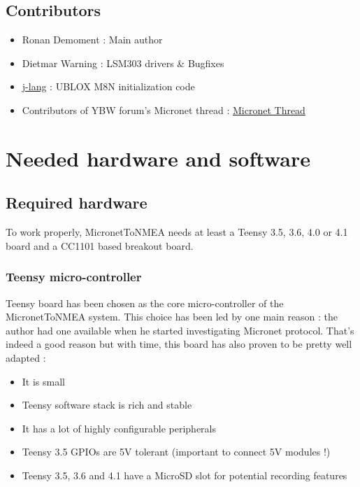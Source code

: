 \documentclass{report}
\begin{document}
\section{Contributors}

\begin{itemize}
\item Ronan Demoment : Main author
\item Dietmar Warning : LSM303 drivers \& Bugfixes
\item \href{https://github.com/j-lang}{j-lang} : UBLOX M8N initialization code
\item Contributors of YBW forum's Micronet thread : \href{https://forums.ybw.com/index.php?threads/raymarines-Micronet.539500/}{Micronet Thread}
\end{itemize}

\chapter{Needed hardware and software}

\section{Required hardware}

To work properly, MicronetToNMEA needs at least a Teensy 3.5, 3.6, 4.0 or 4.1 board and a CC1101 based breakout board.

\subsection{Teensy micro-controller}
Teensy board has been chosen as the core micro-controller of the MicronetToNMEA system. This choice has been led by one main reason : the author had one available when he started investigating Micronet protocol. That's indeed a good reason but with time, this board has also proven to be pretty well adapted :

\begin{itemize}
	\item It is small
	\item Teensy software stack is rich and stable
	\item It has a lot of highly configurable peripherals
	\item Teensy 3.5 GPIOs are 5V tolerant (important to connect 5V modules !)
	\item Teensy 3.5, 3.6 and 4.1 have a MicroSD slot for potential recording features
\end{itemize}
\end{document}
